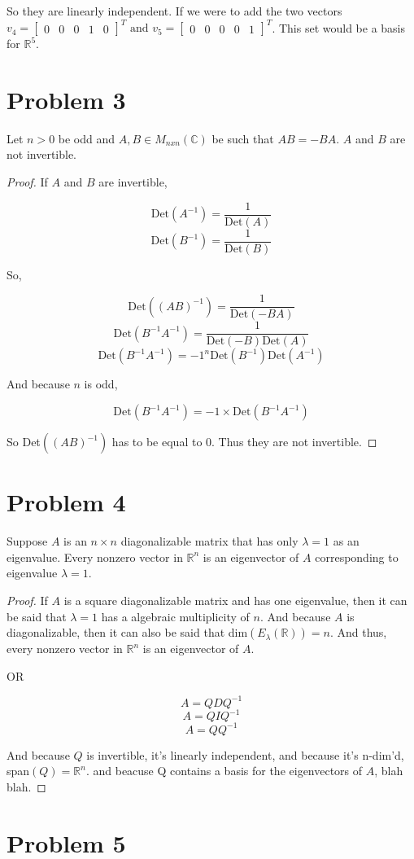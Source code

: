 \documentclass[12pt, letterpaper]{article}
\begin{document}
So they are linearly independent. If we were to add the two vectors $v_4 = \begin{bmatrix} 0 & 0 & 0 & 1 & 0 \end{bmatrix}^T \text{ and } v_5 = \begin{bmatrix} 0 & 0 & 0 & 0 & 1 \end{bmatrix}^T$. This set would be a basis for $\mathbb{R}^5$.

\section*{Problem 3}
Let $n > 0$ be odd and $A, B \in M_{nxn}(\mathbb{C})$ be such that $AB = -BA$. $A$ and $B$ are not invertible.

\begin{proof}
If $A$ and $B$ are invertible, 

\[ \text{Det}(A^{-1}) = \frac{1}{\text{Det}(A)} \]
\[ \text{Det}(B^{-1}) = \frac{1}{\text{Det}(B)} \]

So,

\[ \text{Det}((AB)^{-1}) = \frac{1}{\text{Det}(-BA)} \]
\[ \text{Det}(B^{-1}A^{-1}) = \frac{1}{\text{Det}(-B) \text{Det}(A)} \]
\[ \text{Det}(B^{-1}A^{-1}) = -1^n \text{Det}(B^{-1}) \text{Det}(A^{-1}) \]

And because $n$ is odd, 

\[ \text{Det}(B^{-1}A^{-1}) = -1 \times \text{Det}(B^{-1}A^{-1}) \]

So Det$((AB)^{-1})$ has to be equal to 0. Thus they are not invertible. 
\end{proof}

\section*{Problem 4}
Suppose $A$ is an $n \times n$ diagonalizable matrix that has only $\lambda = 1$ as an eigenvalue. Every nonzero vector in $\mathbb{R}^n$ is an eigenvector of $A$ corresponding to eigenvalue $\lambda = 1$. 

\begin{proof}
If $A$ is a square diagonalizable matrix and has one eigenvalue, then it can be said that $\lambda = 1$ has a algebraic multiplicity of $n$. And because $A$ is diagonalizable, then it can also be said that dim$(E_\lambda(\mathbb{R})) = n$. And thus, every nonzero vector in $\mathbb{R}^n$ is an eigenvector of $A$.

OR

\[ A = QDQ^{-1} \]
\[ A = QIQ^{-1} \]
\[ A = QQ^{-1} \]

And because $Q$ is invertible, it's linearly independent, and because it's n-dim'd, span$(Q) = \mathbb{R}^n$. and beacuse Q contains a basis for the eigenvectors of $A$, blah blah. 
\end{proof}

\section*{Problem 5}
\end{document}
